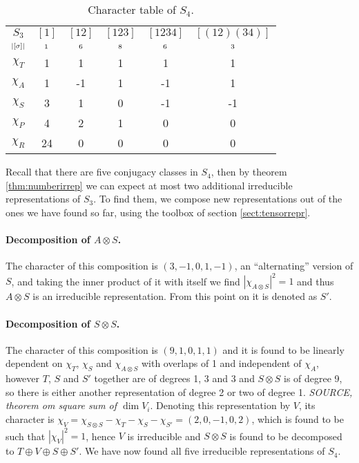\begin{table}[hbt!]
	\centering
	\begin{tabular}{c | c c c c c}
		$S_3$      & $[1]$   & $[12]$  & $[123]$ & $[1234]$ & $[(12)(34)]$ \\
		$\scriptstyle|[\sigma]|$ & $\scriptstyle 1$ & $\scriptstyle 6$ & $\scriptstyle 8$ & $\scriptstyle 6$  & $\scriptstyle 3$      \\ \hline
		$\chi_T$     & 1       & 1       & 1       & 1        & 1            \\
		$\chi_A$     & 1       & -1      & 1       & -1       & 1            \\
		$\chi_S$     & 3       & 1       & 0       & -1       & -1           \\ \hline\hline
		$\chi_P$     & 4       & 2       & 1       & 0        & 0            \\
		$\chi_R$     & 24      & 0       & 0       & 0        & 0            	\end{tabular}
	\caption{Character table of $S_4$.}
	\label{table:charS4}
\end{table}

Recall that there are five conjugacy classes in $S_4$, then by theorem \ref{thm:numberirrep} we can expect at most two additional irreducible representations of $S_3$. To find them, we compose new representations out of the ones we have found so far, using the toolbox of section \ref{sect:tensorrepr}.

\paragraph{Decomposition of $A \otimes S$.} The character of this composition is $(3,-1,0,1,-1)$, an ``alternating'' version of $S$, and taking the inner product of it with itself we find $|\chi_{A \otimes S}|^2 = 1$ and thus $A \otimes S$ is an irreducible representation. From this point on it is denoted as $S'$.

\paragraph{Decomposition of $S \otimes S$.} The character of this composition is $(9,1,0,1,1)$ and it is found to be linearly dependent on $\chi_T$,  $\chi_S$ and $\chi_{A \otimes S}$ with overlaps of 1 and independent of $\chi_A$, however $T$, $S$ and $S'$ together are of degrees 1, 3 and 3 and $S \otimes S$ is of degree 9, so there is either another representation of degree 2 or two of degree 1. \textit{SOURCE, theorem om square sum of $\dim V_i$}. Denoting this representation by $V$, its character is $\chi_V = \chi_{S \otimes S} - \chi_T - \chi_S - \chi_{S'} = (2, 0, -1, 0, 2)$, which is found to be such that $|\chi_V|^2 = 1$, hence $V$ is irreducible and $S \otimes S$ is found to be decomposed to $T \oplus V \oplus S \oplus S'$. We have now found all five irreducible representations of $S_4$.

